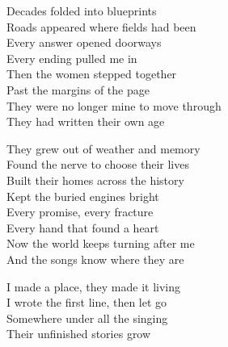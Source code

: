 \begin{lyrics}
Decades folded into blueprints\\
Roads appeared where fields had been\\
Every answer opened doorways\\
Every ending pulled me in\\
Then the women stepped together\\
Past the margins of the page\\
They were no longer mine to move through\\
They had written their own age

They grew out of weather and memory\\
Found the nerve to choose their lives\\
Built their homes across the history\\
Kept the buried engines bright\\
Every promise, every fracture\\
Every hand that found a heart\\
Now the world keeps turning after me\\
And the songs know where they are

I made a place, they made it living\\
I wrote the first line, then let go\\
Somewhere under all the singing\\
Their unfinished stories grow
\end{lyrics}

